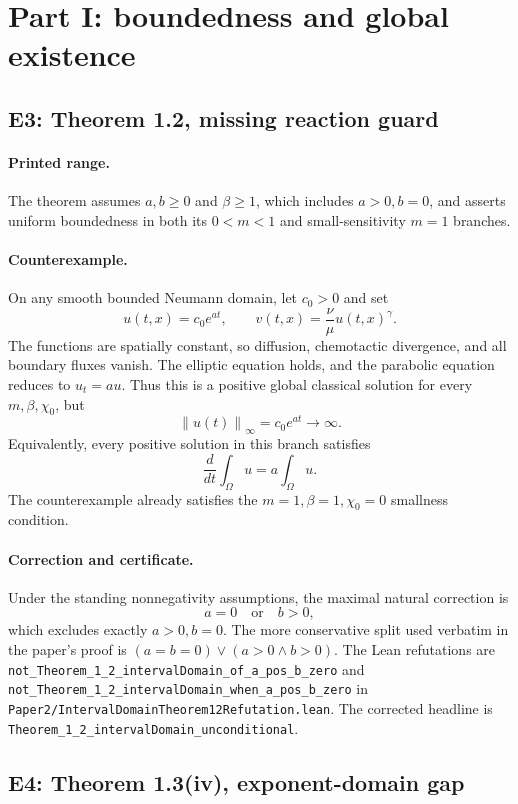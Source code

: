 \documentclass[11pt]{article}
\newcommand{\Om}{\Omega}
\newcommand{\norm}[1]{\left\lVert #1\right\rVert}
\newcommand{\code}[1]{\nolinkurl{#1}}
\begin{document}
\section{Part I: boundedness and global existence}

\subsection{E3: Theorem 1.2, missing reaction guard}

\paragraph{Printed range.}
The theorem assumes \(a,b\ge0\) and \(\beta\ge1\), which includes
\(a>0,b=0\), and asserts uniform boundedness in both its \(0<m<1\) and
small-sensitivity \(m=1\) branches.

\paragraph{Counterexample.}
On any smooth bounded Neumann domain, let \(c_0>0\) and set
\[
  u(t,x)=c_0e^{at},\qquad
  v(t,x)=\frac{\nu}{\mu}u(t,x)^\gamma.
\]
The functions are spatially constant, so diffusion, chemotactic divergence,
and all boundary fluxes vanish.  The elliptic equation holds, and the
parabolic equation reduces to \(u_t=au\).  Thus this is a positive global
classical solution for every \(m,\beta,\chi_0\), but
\[
  \norm{u(t)}_\infty=c_0e^{at}\longrightarrow\infty.
\]
Equivalently, every positive solution in this branch satisfies
\[
  \frac{d}{dt}\int_\Om u=a\int_\Om u.
\]
The counterexample already satisfies the \(m=1,\beta=1,\chi_0=0\) smallness
condition.

\paragraph{Correction and certificate.}
Under the standing nonnegativity assumptions, the maximal natural correction
is
\[
  a=0\quad\text{or}\quad b>0,
\]
which excludes exactly \(a>0,b=0\).  The more conservative split used
verbatim in the paper's proof is
\((a=b=0)\lor(a>0\land b>0)\).  The Lean refutations are
\code{not_Theorem_1_2_intervalDomain_of_a_pos_b_zero} and
\code{not_Theorem_1_2_intervalDomain_when_a_pos_b_zero} in
\code{Paper2/IntervalDomainTheorem12Refutation.lean}.  The corrected
headline is \code{Theorem_1_2_intervalDomain_unconditional}.

\subsection{E4: Theorem 1.3(iv), exponent-domain gap}
\end{document}
